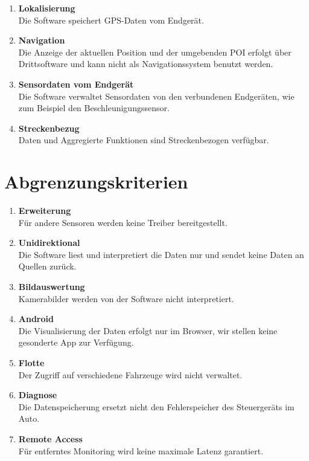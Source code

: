 \documentclass[pflichtenheft.tex]{subfiles}
\begin{document}
\begin{enumerate}
	\item{\textbf{Lokalisierung}}\\Die Software speichert GPS-Daten vom Endgerät.

	\item{\textbf{Navigation}}\\Die Anzeige der aktuellen Position und der umgebenden POI erfolgt über Drittsoftware und kann nicht als Navigationssystem benutzt werden.

	\item{\textbf{Sensordaten vom Endgerät}}\\Die Software verwaltet Sensordaten von den verbundenen Endgeräten, wie zum Beispiel den Beschleunigungssensor.

	\item{\textbf{Streckenbezug}} \\Daten und Aggregierte Funktionen sind Streckenbezogen verfügbar.

\end{enumerate}

\renewcommand{\theenumi}{/AK\ifnum \value{enumi}<10 0\fi\arabic{enumi}0/}
\renewcommand{\labelenumi}{\theenumi}
\renewcommand{\theenumii}{\arabic{enumii}}
\renewcommand{\labelenumii}{/AK\ifnum \value{enumi}<10 0\fi\arabic{enumi}\arabic{enumii}/}

\section{Abgrenzungskriterien}

\begin{enumerate}
	\item{\textbf{Erweiterung}} \\Für andere Sensoren werden keine Treiber bereitgestellt.

	\item{\textbf{Unidirektional}} \\Die Software liest und interpretiert die Daten nur und sendet keine Daten an Quellen zurück.

	\item{\textbf{Bildauswertung}} \\Kamerabilder werden von der Software nicht interpretiert.

	\item{\textbf{Android}} \\Die Visualisierung der Daten erfolgt nur im Browser, wir stellen keine gesonderte App zur Verfügung.

	\item{\textbf{Flotte}} \\Der Zugriff auf verschiedene Fahrzeuge wird nicht verwaltet.


	\item{\textbf{Diagnose}} \\Die Datenspeicherung ersetzt nicht den Fehlerspeicher des Steuergeräts im Auto.

	\item{\textbf{Remote Access}} \\Für entferntes Monitoring wird keine maximale Latenz garantiert.

\end{enumerate}
\end{document}
